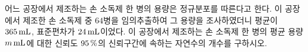 어느 공장에서 제조하는 손 소독제 한 병의 용량은 정규분포를 따른다고 한다. 이 공장에서 제조한 손 소독제 중 $64$병을 임의추출하여 그 용량을 조사하였더니 평균이 $365\mkern3mu \mathrm{mL}$, 표준편차가 $24\mkern3mu \mathrm{mL}$이었다. 이 공장에서 제조하는 손 소독제 한 병의 평균 용량 $m\mkern3mu \mathrm{mL}$에 대한 신뢰도 $95\mkern3mu \%$의 신뢰구간에 속하는 자연수의 개수를 구하시오. 
